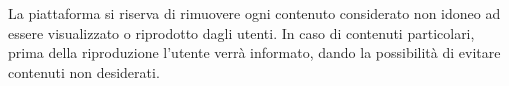 \begin{flushleft}{
La piattaforma si riserva di rimuovere ogni contenuto considerato non idoneo ad essere visualizzato o riprodotto dagli utenti.
\newline
In caso di contenuti particolari, prima della riproduzione l'utente verrà informato, dando la possibilità di evitare contenuti non desiderati.
}
\end{flushleft}